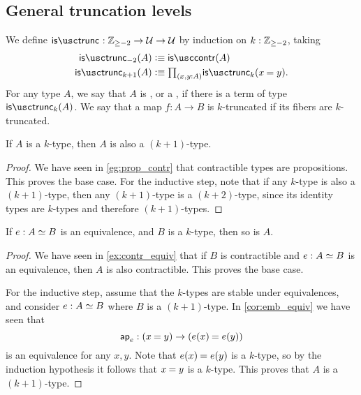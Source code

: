 \subsection{General truncation levels}
\begin{defn}
We define $\istrunc{} : \Z_{\geq-2}\to\UU\to\UU$ by induction on $k:\mathbb{Z}_{\geq -2}$, taking
\begin{align*}
\istrunc{-2}(A) & \defeq \iscontr(A) \\
\istrunc{k+1}(A) & \defeq \prd{x,y:A}\istrunc{k}(\id{x}{y}).\qedhere
\end{align*}
For any type $A$, we say that $A$ is , or a , if there is a term of type $\istrunc{k}(A)$. We say that a map $f:A\to B$ is $k$-truncated if its fibers are $k$-truncated.
\end{defn}


\begin{thm}\label{thm:istrunc_next}
If $A$ is a $k$-type, then $A$ is also a $(k+1)$-type.
\end{thm}

\begin{proof}
We have seen in \cref{eg:prop_contr} that contractible types are propositions. This proves the base case.
For the inductive step, note that if any $k$-type is also a $(k+1)$-type, then any $(k+1)$-type is a $(k+2)$-type, since its identity types are $k$-types and therefore $(k+1)$-types.
\end{proof}

\begin{thm}\label{thm:ktype_eqv}
If $e:\eqv{A}{B}$ is an equivalence, and $B$ is a $k$-type, then so is $A$.
\end{thm}

\begin{proof}
We have seen in \cref{ex:contr_equiv} that if $B$ is contractible and $e:\eqv{A}{B}$ is an equivalence, then $A$ is also contractible. This proves the base case.

For the inductive step, assume that the $k$-types are stable under equivalences, and consider $e:\eqv{A}{B}$ where $B$ is a $(k+1)$-type. In \cref{cor:emb_equiv} we have seen that
\begin{equation*}
\apfunc{e}:(\id{x}{y})\to(\id{e(x)}{e(y)})
\end{equation*}
is an equivalence for any $x,y$. Note that $\id{e(x)}{e(y)}$ is a $k$-type, so by the induction hypothesis it follows that $\id{x}{y}$ is a $k$-type. This proves that $A$ is a $(k+1)$-type.
\end{proof}

